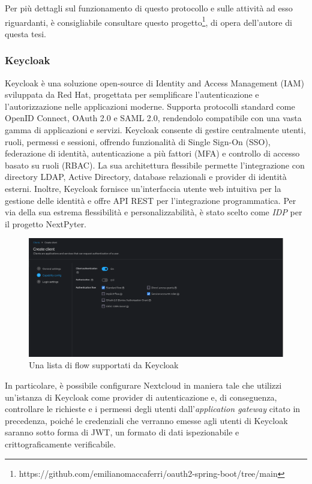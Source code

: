 Per più dettagli sul funzionamento di questo protocollo e sulle attività ad esso riguardanti, è consigliabile consultare questo progetto\footnote{https://github.com/emilianomaccaferri/oauth2-spring-boot/tree/main}, di opera dell'autore di questa tesi.

\subsubsection{Keycloak}
Keycloak è una soluzione open-source di Identity and Access Management (IAM) sviluppata da Red Hat, progettata per semplificare l'autenticazione e l'autorizzazione nelle applicazioni moderne. Supporta protocolli standard come OpenID Connect, OAuth 2.0 e SAML 2.0, rendendolo compatibile con una vasta gamma di applicazioni e servizi. Keycloak consente di gestire centralmente utenti, ruoli, permessi e sessioni, offrendo funzionalità di Single Sign-On (SSO), federazione di identità, autenticazione a più fattori (MFA) e controllo di accesso basato su ruoli (RBAC). La sua architettura flessibile permette l'integrazione con directory LDAP, Active Directory, database relazionali e provider di identità esterni. Inoltre, Keycloak fornisce un'interfaccia utente web intuitiva per la gestione delle identità e offre API REST per l'integrazione programmatica.
\newline
Per via della sua estrema flessibilità e personalizzabilità, è stato scelto come \textit{IDP} per il progetto NextPyter.
\begin{figure}[h]
    \centering
    \includegraphics[width=1\textwidth]{files/images/keycloak.png}
    \caption{Una lista di flow supportati da Keycloak}
    \label{fig:keycloak-clients}
\end{figure}
\newline
In particolare, è possibile configurare Nextcloud in maniera tale che utilizzi un'istanza di Keycloak come provider di autenticazione e, di conseguenza, controllare le richieste e i permessi degli utenti dall'\textit{application gateway} citato in precedenza, poiché le credenziali che verranno emesse agli utenti di Keycloak saranno sotto forma di JWT, un formato di dati ispezionabile e crittograficamente verificabile.